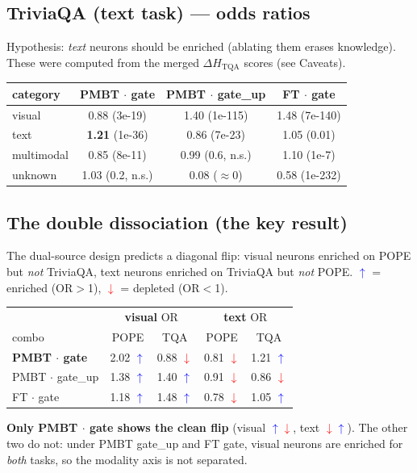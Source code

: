 \documentclass[11pt,a4paper]{article}
\newcommand{\up}{\textcolor{blue}{$\uparrow$}}
\newcommand{\dn}{\textcolor{red}{$\downarrow$}}
\begin{document}
\subsection{TriviaQA (text task) --- odds ratios}
Hypothesis: \emph{text} neurons should be enriched (ablating them erases
knowledge). These were computed from the merged $\Delta H_{\text{TQA}}$ scores
(see Caveats).

\begin{center}
\begin{tabular}{lccc}
\toprule
category & PMBT $\cdot$ gate & PMBT $\cdot$ gate\_up & FT $\cdot$ gate \\
\midrule
visual     & 0.88 (3e-19)        & 1.40 (1e-115) & 1.48 (7e-140) \\
text       & \textbf{1.21} (1e-36)  & 0.86 (7e-23)  & 1.05 (0.01)   \\
multimodal & 0.85 (8e-11)        & 0.99 (0.6, n.s.) & 1.10 (1e-7) \\
unknown    & 1.03 (0.2, n.s.)    & 0.08 ($\approx$0) & 0.58 (1e-232) \\
\bottomrule
\end{tabular}
\end{center}

\subsection{The double dissociation (the key result)}
The dual-source design predicts a diagonal flip: visual neurons enriched on
POPE but \emph{not} TriviaQA, text neurons enriched on TriviaQA but \emph{not}
POPE. \up{} = enriched (OR$>$1), \dn{} = depleted (OR$<$1).

\begin{center}
\begin{tabular}{l cc cc}
\toprule
 & \multicolumn{2}{c}{\textbf{visual} OR} & \multicolumn{2}{c}{\textbf{text} OR} \\
combo & POPE & TQA & POPE & TQA \\
\midrule
\textbf{PMBT $\cdot$ gate}    & 2.02 \up & 0.88 \dn & 0.81 \dn & 1.21 \up \\
PMBT $\cdot$ gate\_up         & 1.38 \up & 1.40 \up & 0.91 \dn & 0.86 \dn \\
FT $\cdot$ gate               & 1.18 \up & 1.48 \up & 0.78 \dn & 1.05 \up \\
\bottomrule
\end{tabular}
\end{center}

\textbf{Only PMBT $\cdot$ gate shows the clean flip} (visual \up\dn{},
text \dn\up). The other two do not: under PMBT gate\_up and FT gate, visual
neurons are enriched for \emph{both} tasks, so the modality axis is not
separated.
\end{document}
